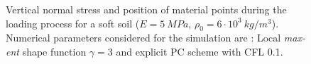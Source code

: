 \documentclass{article}
\begin{document}
\begin{figure}
  \centering
  \qquad
  \qquad
  \caption{Vertical normal stress and position of material points
    during the loading process for a soft soil ($E = 5\ MPa$, $\rho_0
    = 6\cdot 10^3\ kg/m^3$). Numerical parameters considered for the
    simulation are : Local \textit{max-ent} shape function $\gamma =3$
    and explicit PC scheme with CFL 0.1.}
  \label{fig:Block-LME3}
\end{figure}
\end{document}
